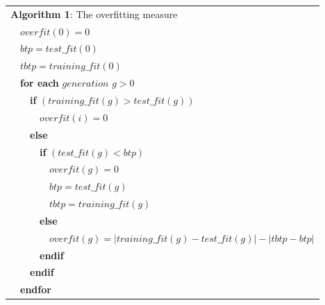 \begin{table}
\begin{tabular}{lllllllllll}
\multicolumn{11}{l}{\textbf{Algorithm 1}: The overfitting measure \cite{2010Vanneschi}} \\
\multicolumn{1}{l|}{} & \multicolumn{10}{l}{$overfit(0) = 0$} \\
\multicolumn{1}{l|}{} & \multicolumn{10}{l}{$btp = test\_fit(0)$} \\
\multicolumn{1}{l|}{} & \multicolumn{10}{l}{$tbtp = training\_fit(0)$} \\
\multicolumn{1}{l|}{} & \multicolumn{10}{l}{\textbf{for each } $generation$ $g>0$ } \\
\multicolumn{1}{l|}{} & \multicolumn{1}{l|}{} & \multicolumn{9}{l}{  \textbf{if} $(training\_fit(g) > test\_fit(g))$} \\
\multicolumn{1}{l|}{} & \multicolumn{1}{l|}{} & \multicolumn{1}{l|}{} & \multicolumn{8}{l}{$overfit(i)= 0$} \\
\multicolumn{1}{l|}{} & \multicolumn{1}{l|}{} & \multicolumn{9}{l}{   \textbf{else}} \\
\multicolumn{1}{l|}{} & \multicolumn{1}{l|}{} & \multicolumn{1}{l|}{} & \multicolumn{8}{l}{\textbf{if} $(test\_fit(g) < btp)$}  \\
\multicolumn{1}{l|}{} & \multicolumn{1}{l|}{} & \multicolumn{1}{l|}{} & \multicolumn{1}{l|}{} & \multicolumn{7}{l}{$overfit(g)= 0$} \\
\multicolumn{1}{l|}{} & \multicolumn{1}{l|}{} & \multicolumn{1}{l|}{} & \multicolumn{1}{l|}{} & \multicolumn{7}{l}{$btp = test\_fit(g)$} \\
\multicolumn{1}{l|}{} & \multicolumn{1}{l|}{} & \multicolumn{1}{l|}{} & \multicolumn{1}{l|}{} & \multicolumn{7}{l}{$tbtp = training\_fit(g)$} \\
\multicolumn{1}{l|}{} & \multicolumn{1}{l|}{} & \multicolumn{1}{l|}{} & \multicolumn{8}{l}{ \textbf{else} } \\
\multicolumn{1}{l|}{} & \multicolumn{1}{l|}{} & \multicolumn{1}{l|}{} & \multicolumn{1}{l|}{} & \multicolumn{7}{l}{ $overfit(g) = |training\_fit(g) - test\_fit(g)| - |tbtp-btp| $} \\
\multicolumn{1}{l|}{} & \multicolumn{1}{l|}{} & \multicolumn{1}{l|}{} & \multicolumn{8}{l}{\textbf{endif}} \\
\multicolumn{1}{l|}{} & \multicolumn{1}{l|}{} & \multicolumn{9}{l}{\textbf{endif}} \\
\multicolumn{1}{l|}{} & \multicolumn{10}{l}{\textbf{endfor}} \\

\end{tabular}
\end{table} 

